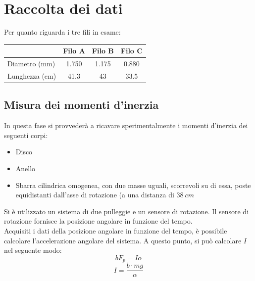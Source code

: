 \section{Raccolta dei dati}
Per quanto riguarda i tre fili in esame:
\begin{center}

\begin{tabular}{l|c|c|c|}
 & Filo A & Filo B & Filo C \\
\midrule
Diametro (mm) & 1.750 & 1.175 & 0.880 \\
Lunghezza (cm) & 41.3 &  43 & 33.5 \\
\midrule
\end{tabular}\end{center}

\subsection{Misura dei momenti d'inerzia}

In questa fase si provvederà a ricavare  sperimentalmente i momenti d'inerzia dei seguenti corpi:
\begin{itemize}
\item Disco 
\item Anello
\item Sbarra cilindrica omogenea, con due masse uguali, scorrevoli su di essa, poste equidistanti dall’asse di rotazione (a una distanza di $38\ cm$
\end{itemize}

Si è utilizzato un sistema di due pulleggie e un sensore di rotazione.
Il sensore di rotazione fornisce la posizione angolare in funzione del tempo. 
\\

Acquisiti i dati della posizione angolare in funzione del tempo, è possibile calcolare l'accelerazione angolare del sistema. A questo punto, si può calcolare $I$ nel seguente modo:
$$ bF_p = I\alpha $$
$$ I = \frac{b\cdot mg}{\alpha} $$

